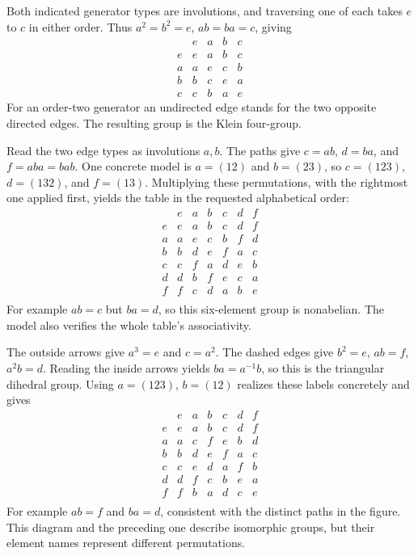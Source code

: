 
Both indicated generator types are involutions, and traversing one of each takes $e$ to $c$ in either order. Thus $a^2=b^2=e$, $ab=ba=c$, giving
\[\begin{array}{c|cccc}&e&a&b&c\\\hline e&e&a&b&c\\a&a&e&c&b\\b&b&c&e&a\\c&c&b&a&e\end{array}\]
For an order-two generator an undirected edge stands for the two opposite directed edges. The resulting group is the Klein four-group.


Read the two edge types as involutions $a,b$. The paths give $c=ab$, $d=ba$, and $f=aba=bab$. One concrete model is $a=(12)$ and $b=(23)$, so $c=(123)$, $d=(132)$, and $f=(13)$. Multiplying these permutations, with the rightmost one applied first, yields the table in the requested alphabetical order:
\[\begin{array}{c|cccccc}&e&a&b&c&d&f\\\hline
e&e&a&b&c&d&f\\
a&a&e&c&b&f&d\\
b&b&d&e&f&a&c\\
c&c&f&a&d&e&b\\
d&d&b&f&e&c&a\\
f&f&c&d&a&b&e\\
\end{array}\]For example $ab=c$ but $ba=d$, so this six-element group is nonabelian. The model also verifies the whole table's associativity.


The outside arrows give $a^3=e$ and $c=a^2$. The dashed edges give $b^2=e$, $ab=f$, $a^2b=d$. Reading the inside arrows yields $ba=a^{-1}b$, so this is the triangular dihedral group. Using $a=(123)$, $b=(12)$ realizes these labels concretely and gives
\[\begin{array}{c|cccccc}&e&a&b&c&d&f\\\hline
e&e&a&b&c&d&f\\
a&a&c&f&e&b&d\\
b&b&d&e&f&a&c\\
c&c&e&d&a&f&b\\
d&d&f&c&b&e&a\\
f&f&b&a&d&c&e\\
\end{array}\]For example $ab=f$ and $ba=d$, consistent with the distinct paths in the figure. This diagram and the preceding one describe isomorphic groups, but their element names represent different permutations.

